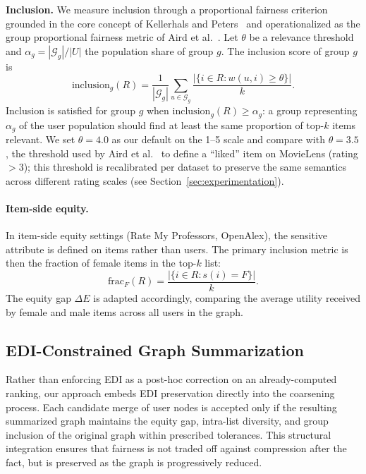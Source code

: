 \documentclass[runningheads]{llncs}
\begin{document}
\smallskip\noindent\textbf{Inclusion.}
We measure inclusion through a proportional fairness criterion grounded in the
core concept of Kellerhals and Peters~\cite{kellerhals_proportional_2024} and
operationalized as the group proportional fairness metric of Aird et
al.~\cite{aird_social_2024}. Let $\theta$ be a relevance threshold and
$\alpha_g = |\mathcal{G}_g|/|U|$ the population share of group $g$. The
inclusion score of group $g$ is
\begin{equation}
  \mathrm{inclusion}_g(R)
    = \frac{1}{|\mathcal{G}_g|}
      \sum_{u \in \mathcal{G}_g}
      \frac{|\{i \in R : w(u,i) \geq \theta\}|}{k}.
\end{equation}
Inclusion is satisfied for group $g$ when $\mathrm{inclusion}_g(R) \geq
\alpha_g$: a group representing $\alpha_g$ of the user population should find
at least the same proportion of top-$k$ items relevant. We set $\theta = 4.0$
as our default on the 1--5 scale and compare with $\theta = 3.5$, the
threshold used by Aird et al.~\cite{aird_social_2024} to define a ``liked''
item on MovieLens (rating $>3$); this threshold is recalibrated per dataset
to preserve the same semantics across different rating scales (see
Section~\ref{sec:experimentation}).

\paragraph{Item-side equity.}
In item-side equity settings (Rate My Professors, OpenAlex), the sensitive
attribute is defined on items rather than users. The primary inclusion metric
is then the fraction of female items in the top-$k$ list:
\[
  \mathrm{frac}_F(R) = \frac{|\{i \in R : s(i) = F\}|}{k}.
\]
The equity gap $\Delta E$ is adapted accordingly, comparing the average
utility received by female and male items across all users in the graph.


\subsection{EDI-Constrained Graph Summarization}
Rather than enforcing EDI as a post-hoc correction on an already-computed
ranking, our approach embeds EDI preservation directly into the coarsening
process. Each candidate merge of user nodes is accepted only if the resulting
summarized graph maintains the equity gap, intra-list diversity, and group
inclusion of the original graph within prescribed tolerances. This structural
integration ensures that fairness is not traded off against compression after
the fact, but is preserved as the graph is progressively reduced.
\end{document}
